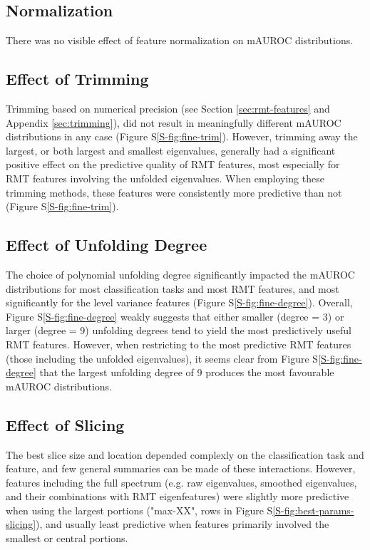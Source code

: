 \documentclass[12pt]{spieman}  %
\begin{document}
\begin{spacing}{2}
\subsection{Normalization}
There was no visible effect of feature normalization on mAUROC distributions.


\subsection{Effect of Trimming}
Trimming based on numerical precision (see Section \ref{sec:rmt-features} and
Appendix \ref{sec:trimming}), did not result in meaningfully different mAUROC
distributions in any case (Figure S\ref{S-fig:fine-trim}). However, trimming
away the largest, or both largest and smallest eigenvalues, generally had a
significant positive effect on the predictive quality of RMT features, most
especially for RMT features involving the unfolded eigenvalues. When employing
these trimming methods, these features were consistently more predictive than
not (Figure S\ref{S-fig:fine-trim}).

\subsection{Effect of Unfolding Degree}
The choice of polynomial unfolding degree significantly impacted the mAUROC
distributions for most classification tasks and most RMT features, and most
significantly for the level variance features (Figure
S\ref{S-fig:fine-degree}). Overall, Figure S\ref{S-fig:fine-degree} weakly
suggests that either smaller (degree = 3) or larger (degree = 9) unfolding
degrees tend to yield the most predictively useful RMT features. However, when
restricting to the most predictive RMT features (those including the unfolded
eigenvalues), it seems clear from Figure S\ref{S-fig:fine-degree} that the
largest unfolding degree of 9 produces the most favourable mAUROC
distributions.

\subsection{Effect of Slicing}
The best slice size and location depended complexly on the classification task
and feature, and few general summaries can be made of these interactions.
However, features including the full spectrum (e.g. raw eigenvalues, smoothed
eigenvalues, and their combinations with RMT eigenfeatures) were slightly more
predictive when using the largest portions ("max-XX", rows in Figure
S\ref{S-fig:best-params-slicing}), and usually least predictive when features
primarily involved the smallest or central portions.


\end{spacing}
\end{document}
